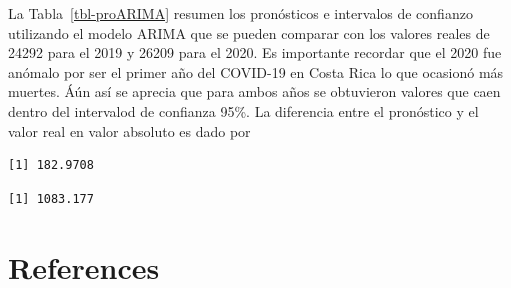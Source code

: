 \documentclass[
  letterpaper,
  onepage,
  openany]{report}
\begin{document}
La Tabla~\ref{tbl-proARIMA} resumen los pronósticos e intervalos de
confianzo utilizando el modelo ARIMA que se pueden comparar con los
valores reales de 24292 para el 2019 y 26209 para el 2020. Es importante
recordar que el 2020 fue anómalo por ser el primer año del COVID-19 en
Costa Rica lo que ocasionó más muertes. Áún así se aprecia que para
ambos años se obtuvieron valores que caen dentro del intervalod de
confianza 95\%. La diferencia entre el pronóstico y el valor real en
valor absoluto es dado por

\begin{verbatim}
[1] 182.9708
\end{verbatim}

\begin{verbatim}
[1] 1083.177
\end{verbatim}


\hypertarget{references}{%
\chapter*{References}\label{references}}
\end{document}
